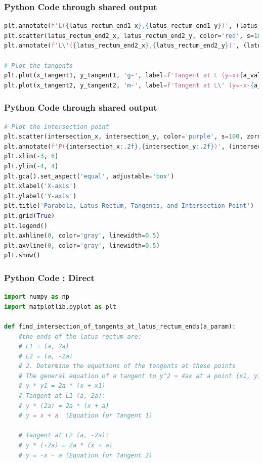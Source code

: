 \documentclass{beamer}
\begin{document}
\begin{frame}[fragile]
\frametitle{Python Code through shared output}
\begin{lstlisting}[language=Python]
plt.annotate(f'L({latus_rectum_end1_x},{latus_rectum_end1_y})', (latus_rectum_end1_x, latus_rectum_end1_y), textcoords="offset points", xytext=(5,5), ha='left')
plt.scatter(latus_rectum_end2_x, latus_rectum_end2_y, color='red', s=100, zorder=5, label=f'End L\' ({latus_rectum_end2_x},{latus_rectum_end2_y})')
plt.annotate(f'L\'({latus_rectum_end2_x},{latus_rectum_end2_y})', (latus_rectum_end2_x, latus_rectum_end2_y), textcoords="offset points", xytext=(5,5), ha='right')

# Plot the tangents
plt.plot(x_tangent1, y_tangent1, 'g-', label=f'Tangent at L (y=x+{a_value})')
plt.plot(x_tangent2, y_tangent2, 'm-', label=f'Tangent at L\' (y=-x-{a_value})')
\end{lstlisting}
\end{frame}

\begin{frame}[fragile]
\frametitle{Python Code through shared output}
\begin{lstlisting}[language=Python]
# Plot the intersection point
plt.scatter(intersection_x, intersection_y, color='purple', s=100, zorder=6, label=f'Intersection ({intersection_x:.2f},{intersection_y:.2f})')
plt.annotate(f'P({intersection_x:.2f},{intersection_y:.2f})', (intersection_x, intersection_y), textcoords="offset points", xytext=(10, -15), ha='left', color='purple', fontsize=12)
plt.xlim(-3, 6)
plt.ylim(-4, 4)
plt.gca().set_aspect('equal', adjustable='box')
plt.xlabel('X-axis')
plt.ylabel('Y-axis')
plt.title('Parabola, Latus Rectum, Tangents, and Intersection Point')
plt.grid(True)
plt.legend()
plt.axhline(0, color='gray', linewidth=0.5)
plt.axvline(0, color='gray', linewidth=0.5)
plt.show()
\end{lstlisting}
\end{frame}

\begin{frame}[fragile]
\frametitle{Python Code : Direct}
\begin{lstlisting}[language=Python]
import numpy as np
import matplotlib.pyplot as plt

def find_intersection_of_tangents_at_latus_rectum_ends(a_param):
    #the ends of the latus rectum are:
    # L1 = (a, 2a)
    # L2 = (a, -2a)
    # 2. Determine the equations of the tangents at these points
    # The general equation of a tangent to y^2 = 4ax at a point (x1, y1) is:
    # y * y1 = 2a * (x + x1)
    # Tangent at L1 (a, 2a):
    # y * (2a) = 2a * (x + a)
    # y = x + a  (Equation for Tangent 1)

    # Tangent at L2 (a, -2a):
    # y * (-2a) = 2a * (x + a)
    # y = -x - a (Equation for Tangent 2)
\end{lstlisting}
\end{frame}
\end{document}
